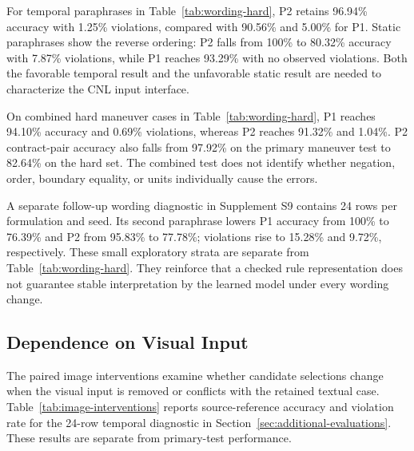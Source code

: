 \documentclass[nolineno]{ieeeaccess}
\begin{document}
For temporal paraphrases in Table~\ref{tab:wording-hard}, P2 retains 96.94\% accuracy with 1.25\% violations, compared with 90.56\% and 5.00\% for P1. Static paraphrases show the reverse ordering: P2 falls from 100\% to 80.32\% accuracy with 7.87\% violations, while P1 reaches 93.29\% with no observed violations. Both the favorable temporal result and the unfavorable static result are needed to characterize the CNL input interface.\par

On combined hard maneuver cases in Table~\ref{tab:wording-hard}, P1 reaches 94.10\% accuracy and 0.69\% violations, whereas P2 reaches 91.32\% and 1.04\%. P2 contract-pair accuracy also falls from 97.92\% on the primary maneuver test to 82.64\% on the hard set. The combined test does not identify whether negation, order, boundary equality, or units individually cause the errors.\par

A separate follow-up wording diagnostic in Supplement S9 contains 24 rows per formulation and seed. Its second paraphrase lowers P1 accuracy from 100\% to 76.39\% and P2 from 95.83\% to 77.78\%; violations rise to 15.28\% and 9.72\%, respectively. These small exploratory strata are separate from Table~\ref{tab:wording-hard}. They reinforce that a checked rule representation does not guarantee stable interpretation by the learned model under every wording change.\par

\subsection{Dependence on Visual Input}\label{sec:image-results}

The paired image interventions examine whether candidate selections change when the visual input is removed or conflicts with the retained textual case. Table~\ref{tab:image-interventions} reports source-reference accuracy and violation rate for the 24-row temporal diagnostic in Section~\ref{sec:additional-evaluations}. These results are separate from primary-test performance.\par
\end{document}
